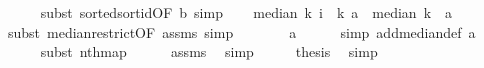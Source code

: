 \begin{isabellebody}
\ \ \ \ \isamarkupfalse%
\ {\isacharparenleft}{\kern0pt}subst\ sorted{\isacharunderscore}{\kern0pt}sort{\isacharunderscore}{\kern0pt}id{\isacharbrackleft}{\kern0pt}OF\ b{\isacharbrackright}{\kern0pt}{\isacharcomma}{\kern0pt}\ simp{\isacharparenright}{\kern0pt}\isanewline
\ \ \isamarkupfalse%
\ {\isachardoublequoteopen}median\ k\ {\isacharparenleft}{\kern0pt}{\isasymlambda}i\ {\isasymin}\ {\isacharbraceleft}{\kern0pt}{}{\isachardot}{\kern0pt}{\isachardot}{\kern0pt}{\isacharless}{\kern0pt}k{\isacharbraceright}{\kern0pt}{\isachardot}{\kern0pt}\ a{\isacharparenright}{\kern0pt}\ {\isacharequal}{\kern0pt}\ median\ k\ {\isacharparenleft}{\kern0pt}{\isasymlambda}{\isacharunderscore}{\kern0pt}{\isachardot}{\kern0pt}\ a{\isacharparenright}{\kern0pt}{\isachardoublequoteclose}\isanewline
\ \ \ \ \isamarkupfalse%
\ {\isacharparenleft}{\kern0pt}subst\ median{\isacharunderscore}{\kern0pt}restrict{\isacharbrackleft}{\kern0pt}OF\ assms{\isacharparenleft}{\kern0pt}{}{\isacharparenright}{\kern0pt}{\isacharbrackright}{\kern0pt}{\isacharcomma}{\kern0pt}\ simp{\isacharparenright}{\kern0pt}\isanewline
\ \ \isamarkupfalse%
\ \isamarkupfalse%
\ {\isachardoublequoteopen}{\isachardot}{\kern0pt}{\isachardot}{\kern0pt}{\isachardot}{\kern0pt}\ {\isacharequal}{\kern0pt}\ a{\isachardoublequoteclose}\isanewline
\ \ \ \ \isamarkupfalse%
\ {\isacharparenleft}{\kern0pt}simp\ add{\isacharcolon}{\kern0pt}median{\isacharunderscore}{\kern0pt}def\ a{\isacharparenright}{\kern0pt}\isanewline
\ \ \ \ \isamarkupfalse%
\ {\isacharparenleft}{\kern0pt}subst\ nth{\isacharunderscore}{\kern0pt}map{\isacharparenright}{\kern0pt}\isanewline
\ \ \ \ \isamarkupfalse%
\ assms\ \isamarkupfalse%
\ simp{\isacharplus}{\kern0pt}\isanewline
\ \ \isamarkupfalse%
\ \isamarkupfalse%
\ {\isacharquery}{\kern0pt}thesis\ \isamarkupfalse%
\ simp\isanewline
{}\isamarkupfalse%
%
\endisatagproof
{\isafoldproof}%
%
\isadelimproof
\isanewline
%
\endisadelimproof
%
\isadelimtheory
\isanewline
%
\endisadelimtheory
%
\isatagtheory
{}\isamarkupfalse%
%
\endisatagtheory
{\isafoldtheory}%
%
\isadelimtheory
%
\endisadelimtheory
%
\end{isabellebody}%
\endinput
